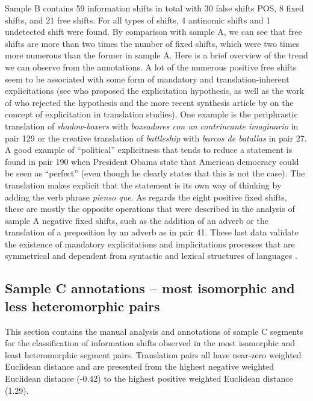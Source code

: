\documentclass[output=paper]{langsci/langscibook}
\begin{document}
Sample B contains 59 information shifts in total with 30 false shifts POS, 8 fixed shifts, and 21 free shifts. For all types of shifts, 4 antinomic shifts and 1 undetected shift were found. By comparison with sample A, we can see that free shifts are more than two times the number of fixed shifts, which were two times more numerous than the former in sample A. Here is a brief overview of the trend we can observe from the annotations. A lot of the numerous positive free shifts seem to be associated with some form of mandatory and translation-inherent explicitations (see \textcite{blum-kulka86} who proposed the explicitation hypothesis, as well as the work of \textcites{becher10}{becher11} who rejected the hypothesis and the more recent synthesis article by \textcite{murtisari16} on the concept of explicitation in translation studies). One example is the periphrastic translation of \textit{shadow-boxers} with \textit{boxeadores con un contrincante imaginario} in pair 129 or the creative translation of \textit{battleship} with \textit{barcos de batallas} in pair 27. A good example of \enquote{political} explicitness that tends to reduce a statement is found in pair 190 when President Obama state that American democracy could be seen as \enquote{perfect} (even though he clearly states that this is not the case). The translation makes explicit that the statement is its own way of thinking by adding the verb phrase \textit{pienso que}. As regards the eight positive fixed shifts, these are mostly the opposite operations that were described in the analysis of sample A negative fixed shifts, such as the addition of an adverb or the translation of a preposition by an adverb as in pair 41. These last data validate the existence of mandatory explicitations and implicitations processes that are symmetrical and dependent from syntactic and lexical structures of languages \parencite[see][]{klaudy11}.

\subsection{Sample C annotations -- most isomorphic and less heteromorphic pairs}\label{ep:sac}

This section contains the manual analysis and annotations of sample C segments for the classification of information shifts observed in the most isomorphic and least heteromorphic segment pairs. Translation pairs all have near-zero weighted Euclidean distance and are presented from the highest negative weighted Euclidean distance (-0.42) to the highest positive weighted Euclidean distance (1.29).
\end{document}
